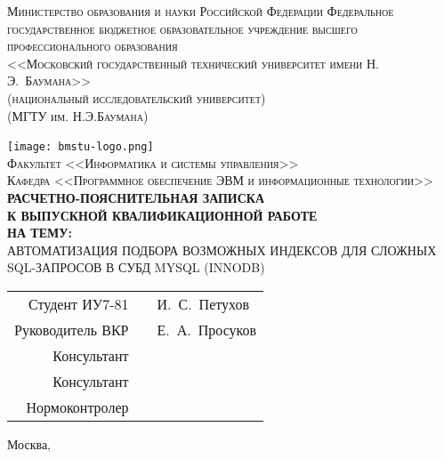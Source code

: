 \newcommand{\HRule}{\rule{\linewidth}{0.5mm}}

\begin{center}

\textsc{
Министерство образования и науки Российской Федерации
Федеральное государственное бюджетное образовательное учреждение 
высшего профессионального образования\\
<<Московский государственный технический университет имени Н.\,Э.~Баумана>>\\
(национальный исследовательский университет)\\
(МГТУ им. Н.Э.Баумана)\\}

\texttt{[image: bmstu-logo.png]}~\\

\textsc{Факультет <<Информатика и системы управления>>}\\
\textsc{Кафедра <<Программное обеспечение ЭВМ и информационные технологии>>}\\[1cm]

\textsc{\large \bfseries РАСЧЕТНО-ПОЯСНИТЕЛЬНАЯ ЗАПИСКА\\К ВЫПУСКНОЙ КВАЛИФИКАЦИОННОЙ РАБОТЕ\\НА ТЕМУ:}\\[1cm]


\textsc{\large АВТОМАТИЗАЦИЯ ПОДБОРА ВОЗМОЖНЫХ ИНДЕКСОВ ДЛЯ СЛОЖНЫХ SQL-ЗАПРОСОВ В СУБД MYSQL (INNODB)}

\vfill

\begin{flushright}
  \begin{tabular}{rll}
    Студент ИУ7-81 & \underline{\hspace{6cm}} & И.~С.~Петухов\\[0.5cm]
    Руководитель ВКР & \underline{\hspace{6cm}} & Е.~А.~Просуков\\[0.5cm]
    Консультант & \underline{\hspace{6cm}} & \underline{\hspace{3cm}}\\[0.5cm]
    Консультант & \underline{\hspace{6cm}} & \underline{\hspace{3cm}}\\[0.5cm]
    Нормоконтролер & \underline{\hspace{6cm}} & \underline{\hspace{3cm}}\\[0.5cm]
  \end{tabular}
\end{flushright}

{\large Москва, \the\year}

\end{center}

\newpage
{}